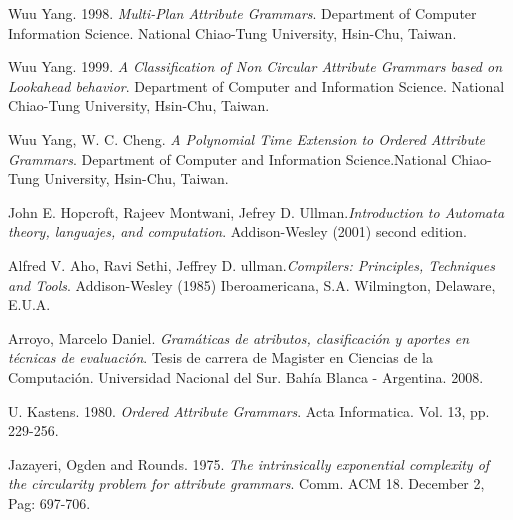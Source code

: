 \documentclass[a4paper]{article}
\begin{document}
%
\begin{thebibliography}{10}

 Wuu Yang. 1998. \textit{Multi-Plan Attribute Grammars}. Department of Computer Information Science. National Chiao-Tung University, Hsin-Chu, Taiwan.

 Wuu Yang. 1999. \textit{A Classification of Non Circular Attribute Grammars based on Lookahead behavior}. Department of Computer and Information Science. National Chiao-Tung University, Hsin-Chu, Taiwan.


 Wuu Yang, W. C. Cheng. \emph{A Polynomial Time Extension to Ordered Attribute Grammars}. Department of Computer and Information Science.National Chiao-Tung University, Hsin-Chu, Taiwan.

 John E. Hopcroft, Rajeev Montwani, Jefrey D. Ullman.\textit{Introduction to Automata theory, languajes, and computation}. Addison-Wesley (2001) second edition.

 Alfred V. Aho, Ravi Sethi, Jeffrey D. ullman.\textit{Compilers: Principles, Techniques and Tools}. Addison-Wesley (1985)  Iberoamericana, S.A. Wilmington, Delaware, E.U.A.

 Arroyo, Marcelo Daniel. \textit{Gramáticas de atributos, clasificación y aportes en técnicas de evaluación}. Tesis de carrera de Magister en Ciencias de la Computación. Universidad Nacional del Sur. Bahía Blanca - Argentina. 2008.

 U. Kastens. 1980. \textit{Ordered Attribute Grammars}. Acta Informatica. Vol. 13, pp. 229-256.

 Jazayeri, Ogden and Rounds. 1975. \emph{The intrinsically exponential complexity of the circularity problem for attribute grammars}. Comm. ACM 18. December 2, Pag: 697-706.




\end{thebibliography}
\end{document}
